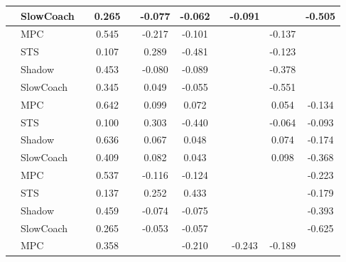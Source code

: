 \begin{tabular}{|l|l|*{9}{c|}}
                                                           & SlowCoach &       &     0.265 &        & -0.077 & -0.062 &     &  -0.091 &      &   -0.505 \\
\midrule
[False, True, False, True, True, False, False, True, False] & MPC &       &     0.545 &        & -0.217 & -0.101 &     &      &  -0.137 &       \\
                                                           & STS &       &     0.107 &        &  0.289 & -0.481 &     &      &  -0.123 &       \\
                                                           & Shadow &       &     0.453 &        & -0.080 & -0.089 &     &      &  -0.378 &       \\
                                                           & SlowCoach &       &     0.345 &        &  0.049 & -0.055 &     &      &  -0.551 &       \\
\midrule
[False, True, False, True, True, False, False, True, True] & MPC &       &     0.642 &        &  0.099 &  0.072 &     &      &   0.054 &   -0.134 \\
                                                           & STS &       &     0.100 &        &  0.303 & -0.440 &     &      &  -0.064 &   -0.093 \\
                                                           & Shadow &       &     0.636 &        &  0.067 &  0.048 &     &      &   0.074 &   -0.174 \\
                                                           & SlowCoach &       &     0.409 &        &  0.082 &  0.043 &     &      &   0.098 &   -0.368 \\
\midrule
[False, True, False, True, True, False, False, False, True] & MPC &       &     0.537 &        & -0.116 & -0.124 &     &      &      &   -0.223 \\
                                                           & STS &       &     0.137 &        &  0.252 &  0.433 &     &      &      &   -0.179 \\
                                                           & Shadow &       &     0.459 &        & -0.074 & -0.075 &     &      &      &   -0.393 \\
                                                           & SlowCoach &       &     0.265 &        & -0.053 & -0.057 &     &      &      &   -0.625 \\
\midrule
[False, True, False, False, True, False, True, True, False] & MPC &       &     0.358 &        &     & -0.210 &     &  -0.243 &  -0.189 &       \\

\end{tabular}
